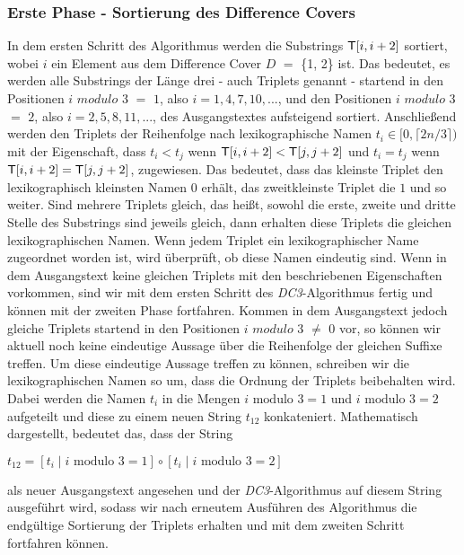 \subsubsection{Erste Phase - Sortierung des Difference Covers}
\label{dc3:algorithmus:phase1}

In dem ersten Schritt des Algorithmus werden die Substrings $\inputtext[i, i+2]$ sortiert, wobei $i$ ein Element aus dem Difference Cover \(D\) $=$ \{1, 2\} ist. Das bedeutet, es werden alle Substrings der Länge drei - auch Triplets genannt - startend in den Positionen \(i\) \(modulo\) \(3\) $=$ \(1\), also $i = 1, 4, 7, 10,...$, und den Positionen \(i\) \(modulo\) \(3\) $=$ \(2\), also $i = 2, 5, 8, 11,...$, des Ausgangstextes  aufsteigend sortiert.
Anschließend werden den Triplets der Reihenfolge nach lexikographische Namen $t_i \in [0,\lceil2n/3\rceil)$ mit der Eigenschaft, dass $t_i < t_j$ wenn $\inputtext[i, i+2] < \inputtext[j, j+2]$ und $t_i = t_j$ wenn $\inputtext[i, i+2] = \inputtext[j, j+2]$, zugewiesen. Das bedeutet, dass das kleinste Triplet den lexikographisch kleinsten Namen $0$ erhält, das zweitkleinste Triplet die $1$ und so weiter. Sind mehrere Triplets gleich, das heißt, sowohl die erste, zweite und dritte Stelle des Substrings sind jeweils gleich, dann erhalten diese Triplets die gleichen lexikographischen Namen.
Wenn jedem Triplet ein lexikographischer Name zugeordnet worden ist, wird überprüft, ob diese Namen eindeutig sind. Wenn in dem Ausgangstext keine gleichen Triplets mit den beschriebenen Eigenschaften vorkommen, sind wir mit dem ersten Schritt des \emph{DC3}-Algorithmus fertig und können mit der zweiten Phase fortfahren. Kommen in dem Ausgangstext  jedoch gleiche Triplets startend in den Positionen \(i\) \(modulo\) \(3\) $\neq$ \(0\) vor, so können wir aktuell noch keine eindeutige Aussage über die Reihenfolge der gleichen Suffixe treffen. Um diese eindeutige Aussage treffen zu können, schreiben wir die lexikographischen Namen so um, dass die Ordnung der Triplets beibehalten wird. Dabei werden die Namen $t_i$ in die Mengen $i \text{ modulo } 3 = 1$ und $i \text{ modulo } 3 = 2$ aufgeteilt und diese zu einem neuen String $t_{12}$ konkateniert. Mathematisch dargestellt, bedeutet das, dass der String
\begin{center}
	$t_{12} = [t_i \mid i \text{ modulo } 3 = 1] \circ [t_i \mid i \text{ modulo } 3 = 2]$ 
\end{center}
als neuer Ausgangstext angesehen und der \emph{DC3}-Algorithmus auf diesem String ausgeführt wird, sodass wir nach erneutem Ausführen des Algorithmus die endgültige Sortierung der Triplets erhalten und mit dem zweiten Schritt fortfahren können.

